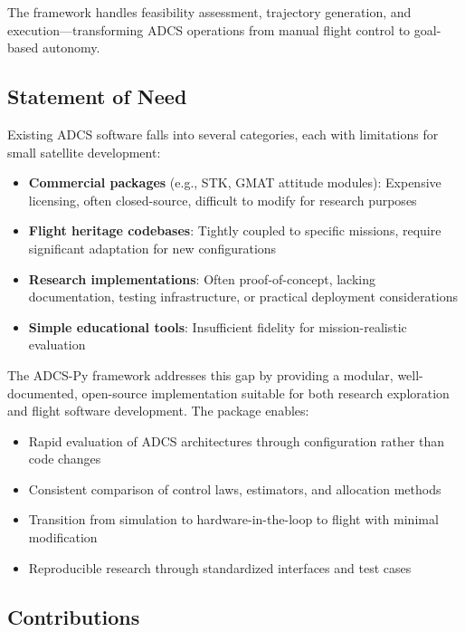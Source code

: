 \documentclass[conference]{IEEEtran}
\begin{document}
The framework handles feasibility assessment, trajectory generation, and execution---transforming ADCS operations from manual flight control to goal-based autonomy.

\subsection{Statement of Need}\label{subsec:need}

Existing ADCS software falls into several categories, each with limitations for small satellite development:

\begin{itemize}
    \item \textbf{Commercial packages} (e.g., STK, GMAT attitude modules): Expensive licensing, often closed-source, difficult to modify for research purposes
    \item \textbf{Flight heritage codebases}: Tightly coupled to specific missions, require significant adaptation for new configurations
    \item \textbf{Research implementations}: Often proof-of-concept, lacking documentation, testing infrastructure, or practical deployment considerations
    \item \textbf{Simple educational tools}: Insufficient fidelity for mission-realistic evaluation
\end{itemize}

The ADCS-Py framework addresses this gap by providing a modular, well-documented, open-source implementation suitable for both research exploration and flight software development. The package enables:

\begin{itemize}
    \item Rapid evaluation of ADCS architectures through configuration rather than code changes
    \item Consistent comparison of control laws, estimators, and allocation methods
    \item Transition from simulation to hardware-in-the-loop to flight with minimal modification
    \item Reproducible research through standardized interfaces and test cases
\end{itemize}

\subsection{Contributions}\label{subsec:contributions}
\end{document}

